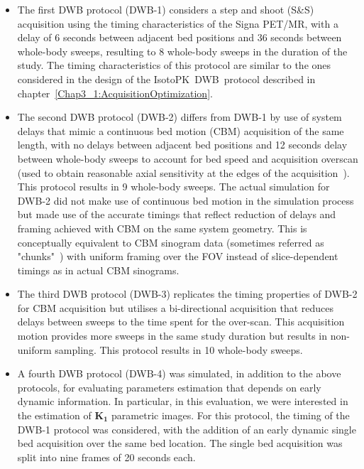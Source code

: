 \begin{itemize}
\item The first DWB protocol (DWB-1) considers a step and shoot (S\&S) acquisition using the timing characteristics of the Signa PET/MR, with a delay of 6 seconds between adjacent bed positions and 36 seconds between whole-body sweeps, resulting to 8 whole-body sweeps in the duration of the study.
The timing characteristics of this protocol are similar to the ones considered in the design of the \mbox{IsotoPK DWB protocol} described in chapter~\ref{Chap3_1:AcquisitionOptimization}.

\item The second DWB protocol (DWB-2) differs from DWB-1 by use of system delays that mimic a continuous bed motion (CBM) acquisition of the same length, with no delays between adjacent bed positions and 12 seconds delay between whole-body sweeps to account for bed speed and acquisition overscan (used to obtain reasonable axial sensitivity at the edges of the acquisition~\cite{Panin2014}). This protocol results in 9 whole-body sweeps. The actual simulation for DWB-2 did not make use of continuous bed motion in the simulation process but made use of the accurate timings that reflect reduction of delays and framing achieved with CBM on the same system geometry. This is conceptually equivalent to CBM sinogram data (sometimes referred as "chunks"~\cite{Hu2014}) with uniform framing over the FOV instead of slice-dependent timings as in actual CBM sinograms. 

\item The third DWB protocol (DWB-3) replicates the timing properties of DWB-2 for CBM acquisition but utilises a bi-directional acquisition that reduces delays between sweeps to the time spent for the over-scan. This acquisition motion provides more sweeps in the same study duration but results in non-uniform sampling. This protocol results in 10 whole-body sweeps.

\item A fourth DWB protocol (DWB-4) was simulated, in addition to the above protocols, for evaluating parameters estimation that depends on early dynamic information. In particular, in this evaluation, we were interested in the estimation of $\boldsymbol{K_1}$ parametric images. For this protocol, the timing of the DWB-1 protocol was considered, with the addition of an early dynamic single bed acquisition over the same bed location. The single bed acquisition was split into nine frames of 20 seconds each.

\end{itemize}
\noindent 

